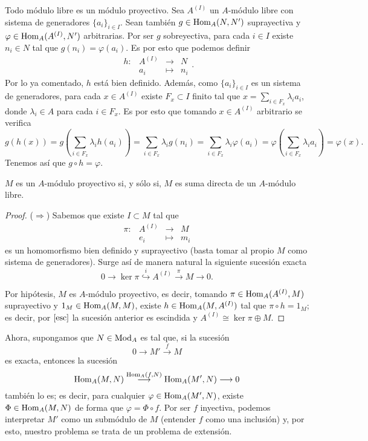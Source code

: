 \documentclass[../main.tex]{subfiles}
\begin{document}
\begin{remark}
	Todo módulo libre es un módulo proyectivo. Sea $A^{(I)}$ un $A$-módulo libre con sistema de generadores $\{a_i\}_{i\in I}$. Sean también $g\in\operatorname{Hom}_A(N,N')$ suprayectiva y $\varphi\in\operatorname{Hom}_A(A^{(I)},N')$ arbitrarias. Por ser $g$ sobreyectiva, para cada $i\in I$ existe $n_i\in N$ tal que $g(n_i)=\varphi(a_i)$. Es por esto que podemos definir
	$$
	\begin{array}{rrcl}
	h:&A^{(I)}&\longrightarrow&N\\
	&a_i&\longmapsto&n_i
	\end{array}.$$
	Por lo ya comentado, $h$ está bien definido. Además, como $\{a_i\}_{i\in I}$ es un sistema de generadores, para cada $x\in A^{(I)}$ existe $F_x\subset I$ finito tal que $x=\sum_{i\in F_x}\lambda_i a_i$, donde $\lambda_i\in A$ para cada $i\in F_x$.
	Es por esto que tomando $x\in A^{(I)}$ arbitrario se verifica
	$$g(h(x))=g\left(\sum_{i\in F_x}\lambda_i h(a_i)\right)=\sum_{i\in F_x}\lambda_i g(n_i)=\sum_{i\in F_x}\lambda_i \varphi(a_i)=\varphi\left(\sum_{i\in F_x}\lambda_i a_i\right)=\varphi(x).$$
	Tenemos así que $g\circ h=\varphi$.
\end{remark}

\begin{proposition}
	$M$ es un $A$-módulo proyectivo si, y sólo si, $M$ es suma directa de un $A$-módulo libre.
\end{proposition}
\begin{proof}
	($\Rightarrow$) Sabemos que existe $I\subset M$ tal que
	$$\begin{array}{rrcl}
	\pi:&A^{(I)}&\longrightarrow&M  \\
	&e_i&\longmapsto&m_i
	\end{array}$$
	es un homomorfismo bien definido y suprayectivo (basta tomar al propio $M$ como sistema de generadores). Surge así de manera natural la siguiente sucesión exacta
	$$0\rightarrow\ker{\pi}\overset{i}{\hookrightarrow}A^{(I)}\overset{\pi}{\rightarrow}M\rightarrow0.$$

	Por hipótesis, $M$ es $A$-módulo proyectivo, es decir, tomando $\pi\in\operatorname{Hom}_A(A^{(I)},M)$ suprayectivo y $1_M\in\operatorname{Hom}_A(M,M)$, existe $h\in\operatorname{Hom}_A(M,A^{(I)})$ tal que $\pi\circ h=1_M$; es decir, por $\ref{esc}$ la sucesión anterior es escindida y $A^{(I)}\cong \ker\pi\oplus M$.
\end{proof}

Ahora, supongamos que $N\in\operatorname{Mod}_A$ es tal que, si la sucesión
$$0\longrightarrow M'\overset{f}{\longrightarrow}M$$
es exacta, entonces la sucesión
$$\operatorname{Hom}_A(M,N)\overset{\operatorname{Hom}_A(f,N)}{\longrightarrow}\operatorname{Hom}_A(M',N)\longrightarrow0$$
también lo es; es decir, para cualquier $\varphi\in\operatorname{Hom}_A(M',N)$, existe $\Phi\in\operatorname{Hom}_A(M,N)$ de forma que $\varphi=\Phi\circ f$. Por ser $f$ inyectiva, podemos interpretar $M'$ como un submódulo de $M$ (entender $f$ como una inclusión) y, por esto, nuestro problema se trata de un problema de extensión.
\end{document}
